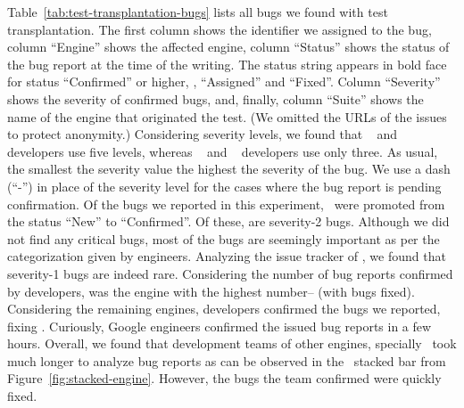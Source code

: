 \documentclass[sigconf,review, anonymous]{acmart}
\begin{document}
Table~\ref{tab:test-transplantation-bugs} lists all bugs we found with
test transplantation. The first column shows the identifier we
assigned to the bug, column ``Engine'' shows the
affected engine, column ``Status'' shows the status of the bug report
at the time of the writing. The status string appears in bold face for
status ``Confirmed'' or higher, \ie{}, ``Assigned'' and ``Fixed''.
Column ``Severity'' shows the severity of confirmed bugs, and,
finally, column ``Suite'' shows the name of the engine that originated
the test.  (We omitted the URLs of the issues to protect anonymity.)
Considering severity levels, we found that \jsc{}~\cite{jsc-severity}
and \smonkey{}~\cite{mozilla-severity} developers use five levels,
whereas \chakra{}~\cite{chakra-severity} and
\veight{}~\cite{v8-severity} developers use only three. As usual, the
smallest the severity value the highest the severity of the bug. We
use a dash (``-'') in place of the severity level for the cases where
the bug report is pending confirmation. Of the
\noBugsTransplantation{} bugs we reported in this experiment,
\noBugsTransplantationConfirmed\ were promoted from the status ``New''
to ``Confirmed''. Of these, \noBugsTransplantationSeverityTwo{} are severity-2 bugs.  Although we did
not find any critical bugs, most of the bugs are seemingly important
as per the categorization given by engineers. Analyzing the issue
tracker of \chakra, we found that severity-1 bugs are indeed
rare. Considering the number of bug reports confirmed by developers,
\chakra{} was the engine with the highest number--\bugsChakra{} (with \bugsChakraFixed{} bugs
fixed). Considering the remaining engines, \veight{} developers
confirmed the \noTransVeightBugsReported{} bugs we reported, fixing 
\noTransVeightBugsFixed{}. Curiously, Google
engineers confirmed the issued bug reports in a few hours. Overall, we
found that development teams of other engines, specially \jsc\, took
much longer to analyze bug reports as can be observed in the
\jsc\ stacked bar from Figure~\ref{fig:stacked-engine}. 
However, the bugs the \jsc{} team confirmed were quickly fixed.

\end{document}
